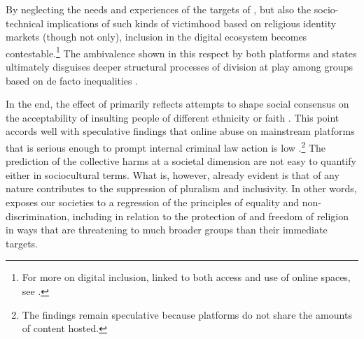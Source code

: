 \documentclass[output=paper,colorlinks,citecolor=brown]{langscibook}
\begin{document}
By neglecting the needs and experiences of the targets of , but also the socio-technical implications of such kinds of victimhood based on religious identity markets (though not only), inclusion in the digital ecosystem becomes contestable.\footnote{%
For more on digital inclusion, linked to both access and use of online spaces, see \citet{candidatu_leurs_ponzanesi2019}.} 
The ambivalence shown in this respect by both platforms and states ultimately disguises deeper structural processes of division at play among groups based on de facto inequalities \citep{nakamura2013}.

In the end, the effect of  primarily reflects attempts to shape social consensus on the acceptability of insulting people of different ethnicity or faith \citep[25]{kreissel_et_al2018}. This point accords well with speculative findings that online abuse on mainstream platforms that is serious enough to prompt internal criminal law action is low \citep[5]{vidgen_margetts_harris2019}.\footnote{%
The findings remain speculative because platforms do not share the amounts of content hosted.} 
The prediction of the collective harms at a societal dimension are not easy to quantify either in sociocultural terms. What is, however, already evident is that  of any nature contributes to the suppression of pluralism and inclusivity. In other words,  exposes our societies to a regression of the principles of equality and non-discrimination, including in relation to the protection of  and freedom of religion in ways that are threatening to much broader groups than their immediate targets.



\sloppy
\printbibliography[heading=subbibliography,notkeyword=this]
\end{document}

